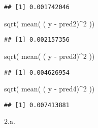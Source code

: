 \documentclass[
]{article}
\newenvironment{Shaded}{\begin{snugshade}}{\end{snugshade}}
\newcommand{\DecValTok}[1]{\textcolor[rgb]{0.00,0.00,0.81}{#1}}
\newcommand{\FunctionTok}[1]{\textcolor[rgb]{0.00,0.00,0.00}{#1}}
\newcommand{\NormalTok}[1]{#1}
\newcommand{\SpecialCharTok}[1]{\textcolor[rgb]{0.00,0.00,0.00}{#1}}
\begin{document}
\begin{verbatim}
## [1] 0.001742046
\end{verbatim}

\begin{Shaded}
\begin{Highlighting}[]
\FunctionTok{sqrt}\NormalTok{( }\FunctionTok{mean}\NormalTok{( ( y }\SpecialCharTok{{-}}\NormalTok{ pred2)}\SpecialCharTok{\^{}}\DecValTok{2}\NormalTok{ ))}
\end{Highlighting}
\end{Shaded}

\begin{verbatim}
## [1] 0.002157356
\end{verbatim}

\begin{Shaded}
\begin{Highlighting}[]
\FunctionTok{sqrt}\NormalTok{( }\FunctionTok{mean}\NormalTok{( ( y }\SpecialCharTok{{-}}\NormalTok{ pred3)}\SpecialCharTok{\^{}}\DecValTok{2}\NormalTok{ ))}
\end{Highlighting}
\end{Shaded}

\begin{verbatim}
## [1] 0.004626954
\end{verbatim}

\begin{Shaded}
\begin{Highlighting}[]
\FunctionTok{sqrt}\NormalTok{( }\FunctionTok{mean}\NormalTok{( ( y }\SpecialCharTok{{-}}\NormalTok{ pred4)}\SpecialCharTok{\^{}}\DecValTok{2}\NormalTok{ ))}
\end{Highlighting}
\end{Shaded}

\begin{verbatim}
## [1] 0.007413881
\end{verbatim}

2.a.
\end{document}
